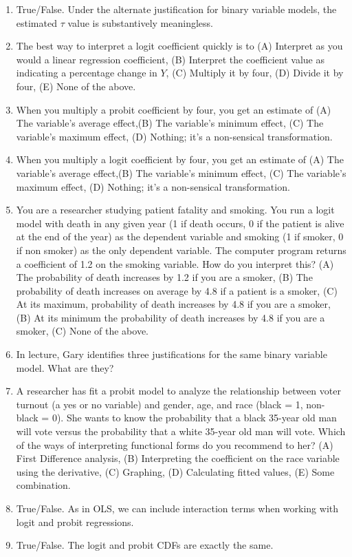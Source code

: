 \documentclass[11pt]{article}
\begin{document}
\begin{enumerate}
\item True/False.  Under the alternate justification for binary variable models, the estimated $\tau$ value is substantively meaningless.
\item The best way to interpret a logit coefficient quickly is to (A) Interpret as you would a linear regression coefficient, (B) Interpret the coefficient value as indicating a percentage change in $Y$, (C) Multiply it by four, (D) Divide it by four, (E) None of the above. 
\item When you multiply a probit coefficient by four, you get an estimate of (A) The variable's average effect,(B) The variable's minimum effect, (C) The variable's maximum effect, (D) Nothing; it's a non-sensical transformation. 
\item When you multiply a logit coefficient by four, you get an estimate of (A) The variable's average effect,(B) The variable's minimum effect, (C) The variable's maximum effect, (D) Nothing; it's a non-sensical transformation. 
\item You are a researcher studying patient fatality and smoking. You run a logit model with death in any given year (1 if death occurs, 0 if the patient is alive at the end of the year) as the dependent variable and smoking (1 if smoker, 0 if non smoker) as the only dependent variable. The computer program returns a coefficient of 1.2 on the smoking variable.  How do you interpret this? (A) The probability of death increases by 1.2 if you are a smoker, (B) The probability of death increases on average by 4.8 if a patient is a smoker, (C) At its maximum, probability of death increases by 4.8 if you are a smoker, (B) At its minimum the probability of death increases by 4.8 if you are a smoker, (C) None of the above.
\item In lecture, Gary identifies three justifications for the same binary variable model. What are they? 
\item A researcher has fit a probit model to analyze the relationship between voter turnout (a yes or no variable) and gender, age, and race (black = 1, non-black = 0).  She wants to know the probability that a black 35-year old man will vote versus the probability that a white 35-year old man will vote.  Which of the ways of interpreting functional forms do you recommend to her? (A) First Difference analysis, (B) Interpreting the coefficient on the race variable using the derivative, (C) Graphing, (D) Calculating fitted values, (E) Some combination.
\item True/False. As in OLS, we can include interaction terms when working with logit and probit regressions.
\item True/False.  The logit and probit CDFs are exactly the same.
\end{enumerate}
\end{document}
